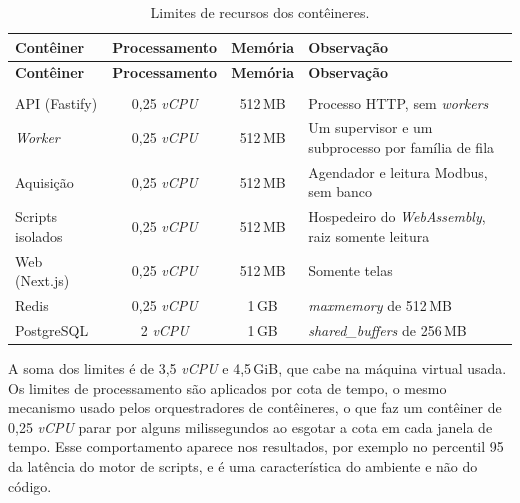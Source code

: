 {\renewcommand{\arraystretch}{1.3}\small
\begin{xltabular}{\textwidth}{lccX}
        \caption{Limites de recursos dos contêineres.}
        \label{tab:cap7_limites}\\
        \hline
        \textbf{Contêiner} & \textbf{Processamento} & \textbf{Memória} & \textbf{Observação} \\
        \hline
        \endfirsthead
        \hline
        \textbf{Contêiner} & \textbf{Processamento} & \textbf{Memória} & \textbf{Observação} \\
        \hline
        \endhead
        \endfoot
         \\
        \endlastfoot
        API (Fastify) & 0,25 \emph{vCPU} & 512\,MB & Processo HTTP, sem \emph{workers} \\
        \hline
        \emph{Worker} & 0,25 \emph{vCPU} & 512\,MB & Um supervisor e um subprocesso por família de fila \\
        \hline
        Aquisição & 0,25 \emph{vCPU} & 512\,MB & Agendador e leitura Modbus, sem banco \\
        \hline
        Scripts isolados & 0,25 \emph{vCPU} & 512\,MB & Hospedeiro do \emph{WebAssembly}, raiz somente leitura \\
        \hline
        Web (Next.js) & 0,25 \emph{vCPU} & 512\,MB & Somente telas \\
        \hline
        Redis & 0,25 \emph{vCPU} & 1\,GB & \emph{maxmemory} de 512\,MB \\
        \hline
        PostgreSQL & 2 \emph{vCPU} & 1\,GB & \emph{shared\_buffers} de 256\,MB \\
        \hline
\end{xltabular}}

\par A soma dos limites é de 3,5 \emph{vCPU} e 4,5\,GiB, que cabe na máquina virtual usada. Os limites de processamento são aplicados por cota de tempo, o mesmo mecanismo usado pelos orquestradores de contêineres, o que faz um contêiner de 0,25 \emph{vCPU} parar por alguns milissegundos ao esgotar a cota em cada janela de tempo. Esse comportamento aparece nos resultados, por exemplo no percentil 95 da latência do motor de scripts, e é uma característica do ambiente e não do código.

